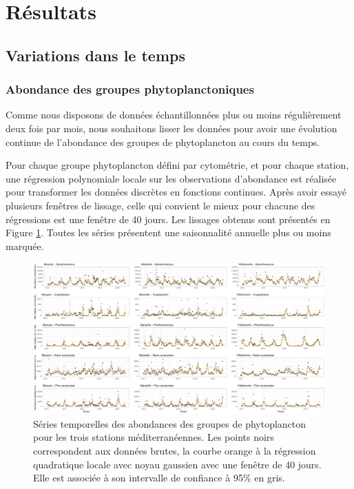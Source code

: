 \documentclass[12pt]{article}
\begin{document}
\section{Résultats}

\subsection{Variations dans le temps}

\subsubsection{Abondance des groupes phytoplanctoniques}

Comme nous disposons de données échantillonnées plus ou moins régulièrement deux fois par mois, nous souhaitons lisser les données pour avoir une évolution continue de l'abondance des groupes de phytoplancton au cours du temps.  

Pour chaque groupe phytoplancton défini par cytométrie, et pour chaque station, une régression polynomiale locale sur les observations d’abondance est réalisée pour transformer les données discrètes en fonctions continues. Après avoir essayé plusieurs fenêtres de lissage, celle qui convient le mieux pour chacune des régressions est une fenêtre de 40 jours. Les lissages obtenus sont présentés en Figure \ref{ts_ab}. Toutes les séries présentent une saisonnalité annuelle plus ou moins marquée. 

\begin{figure}
\includegraphics[width=\textheight]{fig/R11_ts_ab.pdf}
\caption{Séries temporelles des abondances des groupes de phytoplancton pour les trois stations méditerranéennes. Les points noirs correspondent aux données brutes, la courbe orange à la régression quadratique locale avec noyau gaussien avec une fenêtre de 40 jours. Elle est associée à son intervalle de confiance à 95\% en gris.}
\label{ts_ab}
\end{figure}
\end{document}
